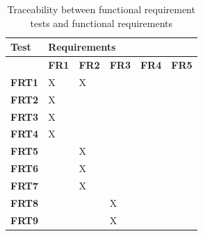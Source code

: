 \documentclass[12pt, titlepage]{article}
\begin{document}
\begin{table}[H]
  \centering
  \caption{Traceability between functional requirement tests and functional requirements }
  \label{tab:my-table}
  \begin{tabular}{|l|lllll|}
  \hline
  \textbf{Test}  & \multicolumn{5}{l|}{\textbf{Requirements}}                                                                                                                   \\ \hline
                 & \multicolumn{1}{l|}{\textbf{FR1}} & \multicolumn{1}{l|}{\textbf{FR2}} & \multicolumn{1}{l|}{\textbf{FR3}} & \multicolumn{1}{l|}{\textbf{FR4}} & \textbf{FR5} \\ \hline
  \textbf{FRT1}  & \multicolumn{1}{l|}{X}            & \multicolumn{1}{l|}{X}            & \multicolumn{1}{l|}{}             & \multicolumn{1}{l|}{}             &              \\ \hline
  \textbf{FRT2}  & \multicolumn{1}{l|}{X}            & \multicolumn{1}{l|}{}             & \multicolumn{1}{l|}{}             & \multicolumn{1}{l|}{}             &              \\ \hline
  \textbf{FRT3}  & \multicolumn{1}{l|}{X}            & \multicolumn{1}{l|}{}             & \multicolumn{1}{l|}{}             & \multicolumn{1}{l|}{}             &              \\ \hline
  \textbf{FRT4}  & \multicolumn{1}{l|}{X}            & \multicolumn{1}{l|}{}             & \multicolumn{1}{l|}{}             & \multicolumn{1}{l|}{}             &              \\ \hline
  \textbf{FRT5}  & \multicolumn{1}{l|}{}             & \multicolumn{1}{l|}{X}            & \multicolumn{1}{l|}{}             & \multicolumn{1}{l|}{}             &              \\ \hline
  \textbf{FRT6}  & \multicolumn{1}{l|}{}             & \multicolumn{1}{l|}{X}            & \multicolumn{1}{l|}{}             & \multicolumn{1}{l|}{}             &              \\ \hline
  \textbf{FRT7}  & \multicolumn{1}{l|}{}             & \multicolumn{1}{l|}{X}            & \multicolumn{1}{l|}{}             & \multicolumn{1}{l|}{}             &              \\ \hline
  \textbf{FRT8}  & \multicolumn{1}{l|}{}             & \multicolumn{1}{l|}{}             & \multicolumn{1}{l|}{X}            & \multicolumn{1}{l|}{}             &              \\ \hline
  \textbf{FRT9}  & \multicolumn{1}{l|}{}             & \multicolumn{1}{l|}{}             & \multicolumn{1}{l|}{X}            & \multicolumn{1}{l|}{}             &              \\ \hline

\end{tabular}
\end{table}
\end{document}
